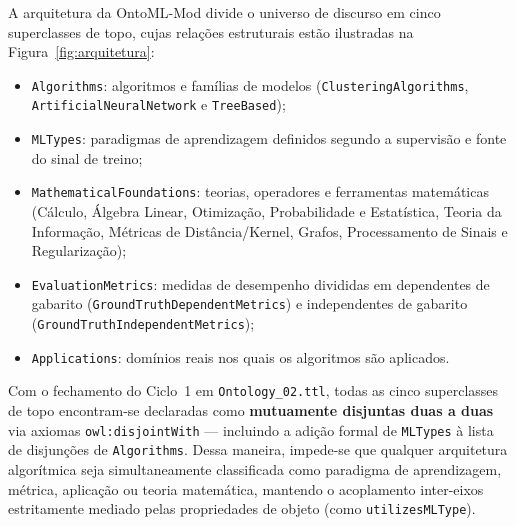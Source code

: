 \documentclass[11pt,a4paper]{article}
\newcommand{\onto}[1]{\texttt{#1}}
\begin{document}
A arquitetura da OntoML-Mod divide o universo de discurso em cinco superclasses de topo, cujas relações estruturais estão ilustradas na Figura~\ref{fig:arquitetura}:
\begin{itemize}[leftmargin=*,nosep]
  \item \onto{Algorithms}: algoritmos e famílias de modelos (\onto{ClusteringAlgorithms}, \onto{ArtificialNeuralNetwork} e \onto{TreeBased});
  \item \onto{MLTypes}: paradigmas de aprendizagem definidos segundo a supervisão e fonte do sinal de treino;
  \item \onto{MathematicalFoundations}: teorias, operadores e ferramentas matemáticas (Cálculo, Álgebra Linear, Otimização, Probabilidade e Estatística, Teoria da Informação, Métricas de Distância/Kernel, Grafos, Processamento de Sinais e Regularização);
  \item \onto{EvaluationMetrics}: medidas de desempenho divididas em dependentes de gabarito (\onto{GroundTruthDependentMetrics}) e independentes de gabarito (\onto{GroundTruthIndependentMetrics});
  \item \onto{Applications}: domínios reais nos quais os algoritmos são aplicados.
\end{itemize}

Com o fechamento do Ciclo~1 em \texttt{Ontology\_02.ttl}, todas as cinco superclasses de topo encontram-se declaradas como \textbf{mutuamente disjuntas duas a duas} via axiomas \onto{owl:disjointWith} --- incluindo a adição formal de \onto{MLTypes} à lista de disjunções de \onto{Algorithms}. Dessa maneira, impede-se que qualquer arquitetura algorítmica seja simultaneamente classificada como paradigma de aprendizagem, métrica, aplicação ou teoria matemática, mantendo o acoplamento inter-eixos estritamente mediado pelas propriedades de objeto (como \onto{utilizesMLType}).
\end{document}
